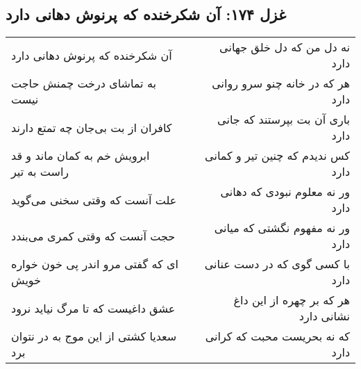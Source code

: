 \begin{center}
\section*{غزل ۱۷۴: آن شکرخنده که پرنوش دهانی دارد}
\label{sec:174}
\begin{longtable}{l p{0.5cm} r}
آن شکرخنده که پرنوش دهانی دارد
&&
نه دل من که دل خلق جهانی دارد
\\
به تماشای درخت چمنش حاجت نیست
&&
هر که در خانه چنو سرو روانی دارد
\\
کافران از بت بی‌جان چه تمتع دارند
&&
باری آن بت بپرستند که جانی دارد
\\
ابرویش خم به کمان ماند و قد راست به تیر
&&
کس ندیدم که چنین تیر و کمانی دارد
\\
علت آنست که وقتی سخنی می‌گوید
&&
ور نه معلوم نبودی که دهانی دارد
\\
حجت آنست که وقتی کمری می‌بندد
&&
ور نه مفهوم نگشتی که میانی دارد
\\
ای که گفتی مرو اندر پی خون خواره خویش
&&
با کسی گوی که در دست عنانی دارد
\\
عشق داغیست که تا مرگ نیاید نرود
&&
هر که بر چهره از این داغ نشانی دارد
\\
سعدیا کشتی از این موج به در نتوان برد
&&
که نه بحریست محبت که کرانی دارد
\\
\end{longtable}
\end{center}
